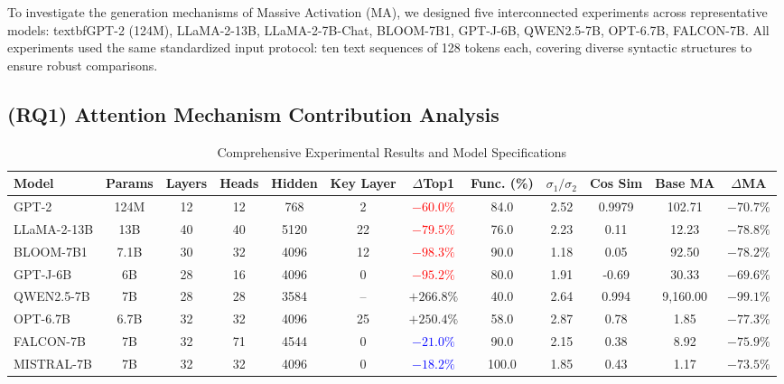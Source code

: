 \documentclass[conference]{IEEEtran}
\begin{document}
To investigate the generation mechanisms of Massive Activation (MA), we designed five interconnected experiments across representative models: textbf{GPT-2 (124M)}, LLaMA-2-13B, LLaMA-2-7B-Chat, BLOOM-7B1, GPT-J-6B, QWEN2.5-7B, OPT-6.7B, FALCON-7B. All experiments used the same standardized input protocol: ten text sequences of 128 tokens each, covering diverse syntactic structures to ensure robust comparisons.

\subsection{(RQ1) Attention Mechanism Contribution Analysis}
\label{sec:RQ1}

\begin{table}[htbp]
\centering
\caption{Comprehensive Experimental Results and Model Specifications}
\label{tab:comprehensive_experimental_results}
\footnotesize
\begin{tabular}{@{}lccccccccccc@{}}
\toprule
\textbf{Model} & \textbf{Params} & \textbf{Layers} & \textbf{Heads} & \textbf{Hidden} & \textbf{Key Layer} & \textbf{$\Delta$Top1} & \textbf{Func. (\%)} & \textbf{$\sigma_1/\sigma_2$} & \textbf{Cos Sim} & \textbf{Base MA} & \textbf{$\Delta$MA} \\
\midrule
GPT-2 & 124M & 12 & 12 & 768 & 2 & \textcolor{red}{$-60.0\%$} & 84.0 & 2.52 & 0.9979 & 102.71 & $-70.7\%$ \\
LLaMA-2-13B & 13B & 40 & 40 & 5120 & 22 & \textcolor{red}{$-79.5\%$} & 76.0 & 2.23 & 0.11 & 12.23 & $-78.8\%$ \\
BLOOM-7B1 & 7.1B & 30 & 32 & 4096 & 12 & \textcolor{red}{$-98.3\%$} & 90.0 & 1.18 & 0.05 & 92.50 & $-78.2\%$ \\
GPT-J-6B & 6B & 28 & 16 & 4096 & 0 & \textcolor{red}{$-95.2\%$} & 80.0 & 1.91 & -0.69 & 30.33 & $-69.6\%$ \\
\midrule
QWEN2.5-7B & 7B & 28 & 28 & 3584 & -- & \textcolor{green!60!black}{$+266.8\%$} & 40.0 & 2.64 & 0.994 & 9,160.00 & $-99.1\%$ \\
OPT-6.7B & 6.7B & 32 & 32 & 4096 & 25 & \textcolor{green!60!black}{$+250.4\%$} & 58.0 & 2.87 & 0.78 & 1.85 & $-77.3\%$ \\
\midrule
FALCON-7B & 7B & 32 & 71 & 4544 & 0 & \textcolor{blue}{$-21.0\%$} & 90.0 & 2.15 & 0.38 & 8.92 & $-75.9\%$ \\
MISTRAL-7B & 7B & 32 & 32 & 4096 & 0 & \textcolor{blue}{$-18.2\%$} & 100.0 & 1.85 & 0.43 & 1.17 & $-73.5\%$ \\
\bottomrule
\end{tabular}

\end{table}
\end{document}
